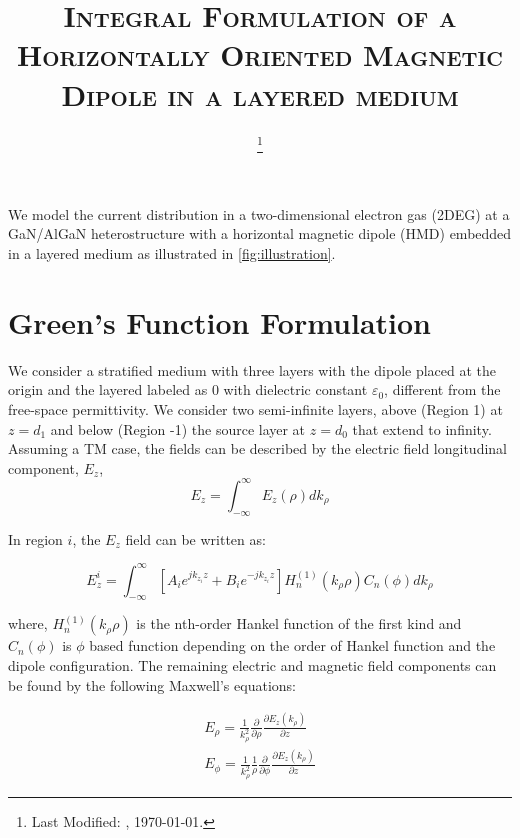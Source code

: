 \documentclass{article}
\begin{document}
  \title{\textsc{Integral Formulation of a Horizontally Oriented Magnetic Dipole in a layered medium}\\}
  \date{\footnote{Last Modified: \currenttime, \today.}}
  \maketitle

  We model the current distribution in a two-dimensional electron gas (2DEG) at a GaN/AlGaN heterostructure with a horizontal magnetic dipole (HMD) embedded in a layered medium as illustrated in \ref{fig:illustration}.
  \section{Green's Function Formulation}

  We consider a stratified medium with three layers with the dipole placed at the origin and the layered labeled as $0$ with dielectric constant $\varepsilon_0$, different from the free-space permittivity. We consider two semi-infinite layers, above (Region 1) at $z=d_1$ and below (Region -1) the source layer at $z=d_0$ that extend to infinity. Assuming a TM case, the fields can be described by the electric field longitudinal component, $E_z$,
  \begin{equation}
    E_z = \int_{-\infty}^{\infty} E_z(\rho) dk_{\rho}
    \label{eq:Ez}
  \end{equation}

  In region $i$, the $E_z$ field can be written as:

  \begin{equation}
    E_z^i = \int_{-\infty}^{\infty} \left[ A_i e^{j k_{z_i}z} + B_i e^{-j k_{z_i}z} \right] H_n^{(1)}(k_{\rho}\rho) C_n(\phi) dk_{\rho}
    \label{eq:TM_Ez}
  \end{equation}

  where, $H_n^{(1)}(k_{\rho}\rho)$ is the nth-order Hankel function of the first kind and $C_n(\phi)$ is $\phi$ based function depending on the order of Hankel function and the dipole configuration. The remaining electric and magnetic field components can be found by the following Maxwell's equations:

  \begin{subequations}
    \begin{align}
      E_{\rho} =  \frac{1}{k_{\rho}^2} \frac{\partial}{\partial \rho} \frac{\partial E_z(k_\rho)}{\partial z}
      \label{eq:E_rho} \\
      E_{\phi} =  \frac{1}{k_{\rho}^2} \frac{1}{\rho} \frac{\partial}{ \partial \phi} \frac{\partial E_z(k_\rho)}{\partial z}
      \label{eq:E_phi}
    \end{align}
    \label{eq:E_fields}
  \end{subequations}
\end{document}
